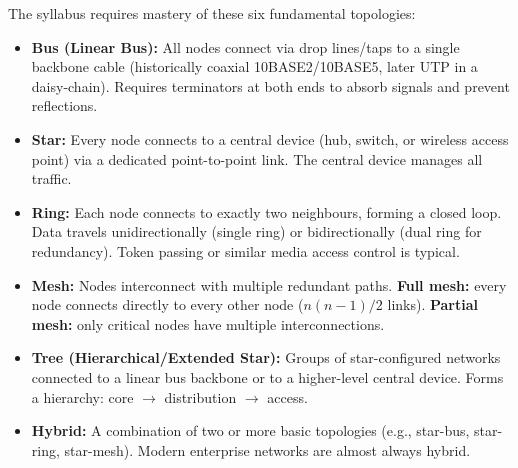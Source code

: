 \documentclass[11pt]{article}
\begin{document}
\begin{propriete}
The syllabus requires mastery of these six fundamental topologies:
\begin{itemize}
\item \textbf{Bus (Linear Bus):} All nodes connect via drop lines/taps to a single backbone cable (historically coaxial 10BASE2/10BASE5, later UTP in a daisy-chain). Requires terminators at both ends to absorb signals and prevent reflections.
\item \textbf{Star:} Every node connects to a central device (hub, switch, or wireless access point) via a dedicated point-to-point link. The central device manages all traffic.
\item \textbf{Ring:} Each node connects to exactly two neighbours, forming a closed loop. Data travels unidirectionally (single ring) or bidirectionally (dual ring for redundancy). Token passing or similar media access control is typical.
\item \textbf{Mesh:} Nodes interconnect with multiple redundant paths. \textbf{Full mesh:} every node connects directly to every other node ($n(n-1)/2$ links). \textbf{Partial mesh:} only critical nodes have multiple interconnections.
\item \textbf{Tree (Hierarchical/Extended Star):} Groups of star-configured networks connected to a linear bus backbone or to a higher-level central device. Forms a hierarchy: core $\rightarrow$ distribution $\rightarrow$ access.
\item \textbf{Hybrid:} A combination of two or more basic topologies (e.g., star-bus, star-ring, star-mesh). Modern enterprise networks are almost always hybrid.
\end{itemize}
\end{propriete}
\end{document}
